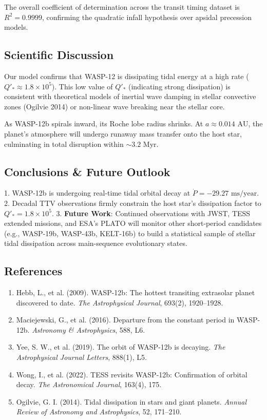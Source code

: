 \documentclass[11pt,a4paper]{article}
\begin{document}
The overall coefficient of determination across the transit timing dataset is $R^2 = 0.9999$, confirming the quadratic infall hypothesis over apsidal precession models.

\subsection{Scientific Discussion}
Our model confirms that WASP-12 is dissipating tidal energy at a high rate ($Q'_* \approx 1.8 \times 10^5$). This low value of $Q'_*$ (indicating strong dissipation) is consistent with theoretical models of inertial wave damping in stellar convective zones (Ogilvie 2014) or non-linear wave breaking near the stellar core.

As WASP-12b spirals inward, its Roche lobe radius shrinks. At $a \approx 0.014\text{ AU}$, the planet's atmosphere will undergo runaway mass transfer onto the host star, culminating in total disruption within $\sim 3.2\text{ Myr}$.

\subsection{Conclusions \& Future Outlook}
1. WASP-12b is undergoing real-time tidal orbital decay at $\dot{P} = -29.27\text{ ms/year}$.
2. Decadal TTV observations firmly constrain the host star's dissipation factor to $Q'_* = 1.8 \times 10^5$.
3. \textbf{Future Work}: Continued observations with JWST, TESS extended missions, and ESA's PLATO will monitor other short-period candidates (e.g., WASP-19b, WASP-43b, KELT-16b) to build a statistical sample of stellar tidal dissipation across main-sequence evolutionary states.

\subsection*{References}
\begin{enumerate}
    \item Hebb, L., et al. (2009). WASP-12b: The hottest transiting extrasolar planet discovered to date. \textit{The Astrophysical Journal}, 693(2), 1920--1928.
    \item Maciejewski, G., et al. (2016). Departure from the constant period in WASP-12b. \textit{Astronomy \& Astrophysics}, 588, L6.
    \item Yee, S. W., et al. (2019). The orbit of WASP-12b is decaying. \textit{The Astrophysical Journal Letters}, 888(1), L5.
    \item Wong, I., et al. (2022). TESS revisits WASP-12b: Confirmation of orbital decay. \textit{The Astronomical Journal}, 163(4), 175.
    \item Ogilvie, G. I. (2014). Tidal dissipation in stars and giant planets. \textit{Annual Review of Astronomy and Astrophysics}, 52, 171--210.
\end{enumerate}
\end{document}
